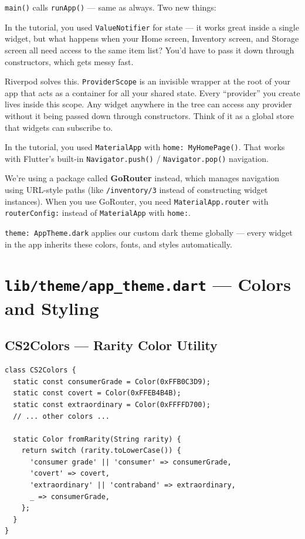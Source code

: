 \documentclass[11pt, a4paper]{article}
\begin{document}
\texttt{main()} calls \texttt{runApp()} --- same as always. Two new things:

\begin{conceptbox}[title=\textbf{ProviderScope (Riverpod)}]
In the tutorial, you used \texttt{ValueNotifier} for state --- it works great inside a single widget, but what happens when your Home screen, Inventory screen, and Storage screen all need access to the same item list? You'd have to pass it down through constructors, which gets messy fast.

Riverpod solves this. \texttt{ProviderScope} is an invisible wrapper at the root of your app that acts as a container for all your shared state. Every ``provider'' you create lives inside this scope. Any widget anywhere in the tree can access any provider without it being passed down through constructors. Think of it as a global store that widgets can subscribe to.
\end{conceptbox}

\begin{conceptbox}[title=\textbf{MaterialApp.router}]
In the tutorial, you used \texttt{MaterialApp} with \texttt{home: MyHomePage()}. That works with Flutter's built-in \texttt{Navigator.push()} / \texttt{Navigator.pop()} navigation.

We're using a package called \textbf{GoRouter} instead, which manages navigation using URL-style paths (like \texttt{/inventory/3} instead of constructing widget instances). When you use GoRouter, you need \texttt{MaterialApp.router} with \texttt{routerConfig:} instead of \texttt{MaterialApp} with \texttt{home:}.
\end{conceptbox}

\texttt{theme: AppTheme.dark} applies our custom dark theme globally --- every widget in the app inherits these colors, fonts, and styles automatically.

\newpage

\section{\texttt{lib/theme/app\_theme.dart} --- Colors and Styling}

\subsection{CS2Colors --- Rarity Color Utility}

\begin{lstlisting}
class CS2Colors {
  static const consumerGrade = Color(0xFFB0C3D9);
  static const covert = Color(0xFFEB4B4B);
  static const extraordinary = Color(0xFFFFD700);
  // ... other colors ...

  static Color fromRarity(String rarity) {
    return switch (rarity.toLowerCase()) {
      'consumer grade' || 'consumer' => consumerGrade,
      'covert' => covert,
      'extraordinary' || 'contraband' => extraordinary,
      _ => consumerGrade,
    };
  }
}
\end{lstlisting}
\end{document}
